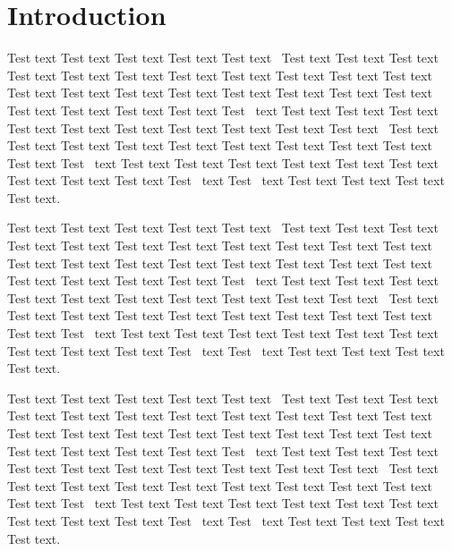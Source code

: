 \documentclass[animals,article,accept,moreauthors,pdftex]{Definitions/mdpi}
\begin{document}
\section{Introduction \label{sect:sec1-animals-4264543}}

Test text Test text Test text Test text Test text~\cite{B1-animals-4264543} Test text Test text Test text Test text Test text Test text Test text Test text Test text Test text Test text Test text Test text Test text Test text Test text Test text Test text Test text Test text Test text Test text Test text Test~\cite{B2-animals-4264543} text Test text Test text Test text Test text Test text Test text Test text Test text Test text Test text~\cite{B3-animals-4264543} Test text Test text Test text Test text Test text Test text Test text Test text Test text Test text Test~\cite{B4-animals-4264543} text Test text Test text Test text Test text Test text Test text Test text Test text Test text Test~\cite{B5-animals-4264543} text Test~\cite{B6-animals-4264543} text Test text Test text Test text Test text.

Test text Test text Test text Test text Test text~\cite{B1-animals-4264543} Test text Test text Test text Test text Test text Test text Test text Test text Test text Test text Test text Test text Test text Test text Test text Test text Test text Test text Test text Test text Test text Test text Test text Test~\cite{B2-animals-4264543} text Test text Test text Test text Test text Test text Test text Test text Test text Test text Test text~\cite{B3-animals-4264543} Test text Test text Test text Test text Test text Test text Test text Test text Test text Test text Test~\cite{B4-animals-4264543} text Test text Test text Test text Test text Test text Test text Test text Test text Test text Test~\cite{B5-animals-4264543} text Test~\cite{B6-animals-4264543} text Test text Test text Test text Test text.


Test text Test text Test text Test text Test text~\cite{B1-animals-4264543} Test text Test text Test text Test text Test text Test text Test text Test text Test text Test text Test text Test text Test text Test text Test text Test text Test text Test text Test text Test text Test text Test text Test text Test~\cite{B2-animals-4264543} text Test text Test text Test text Test text Test text Test text Test text Test text Test text Test text~\cite{B3-animals-4264543} Test text Test text Test text Test text Test text Test text Test text Test text Test text Test text Test~\cite{B4-animals-4264543} text Test text Test text Test text Test text Test text Test text Test text Test text Test text Test~\cite{B5-animals-4264543} text Test~\cite{B6-animals-4264543} text Test text Test text Test text Test text.
\end{document}
